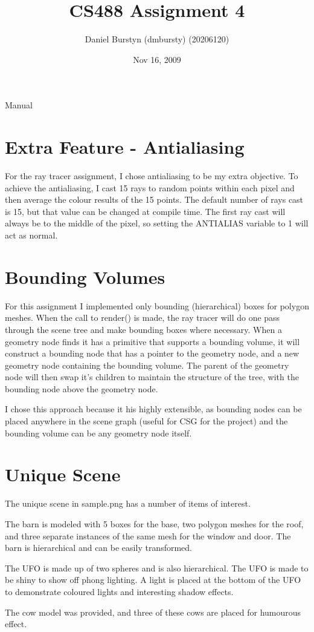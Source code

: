 \documentclass[12pt]{article}
\title{CS488 Assignment 4}
\author{Daniel Burstyn (dmbursty) (20206120)}
\date{Nov 16, 2009}
\begin{document}
\begin{titlepage}
\maketitle
\thispagestyle{empty}
\end{titlepage}
\newpage

\begin{center}
\begin{Huge}
Manual
\end{Huge}
\end{center}

\section{Extra Feature - Antialiasing}
For the ray tracer assignment, I chose antialiasing to be my extra objective.
To achieve the antialiasing, I cast 15 rays to random points within each pixel
and then average the colour results of the 15 points.  The default number of
rays cast is 15, but that value can be changed at compile time.  The first ray
cast will always be to the middle of the pixel, so setting the ANTIALIAS
variable to 1 will act as normal.

\section{Bounding Volumes}
For this assignment I implemented only bounding (hierarchical) boxes for polygon
meshes.  When the call to render() is made, the ray tracer will do one pass
through the scene tree and make bounding boxes where necessary.  When a geometry
node finds it has a primitive that supports a bounding volume, it will construct
a bounding node that has a pointer to the geometry node, and a new geometry node
containing the bounding volume.  The parent of the geometry node will then swap
it's children to maintain the structure of the tree, with the bounding node
above the geometry node.

I chose this approach because it his highly extensible, as bounding nodes can be
placed anywhere in the scene graph (useful for CSG for the project) and the
bounding volume can be any geometry node itself.

\section{Unique Scene}
The unique scene in sample.png has a number of items of interest.

The barn is modeled with 5 boxes for the base, two polygon meshes for the roof,
and three separate instances of the same mesh for the window and door.  The barn
is hierarchical and can be easily transformed.

The UFO is made up of two spheres and is also hierarchical.  The UFO is made to
be shiny to show off phong lighting.  A light is placed at the bottom of the UFO
to demonstrate coloured lights and interesting shadow effects.

The cow model was provided, and three of these cows are placed for humourous
effect.
\end{document}
